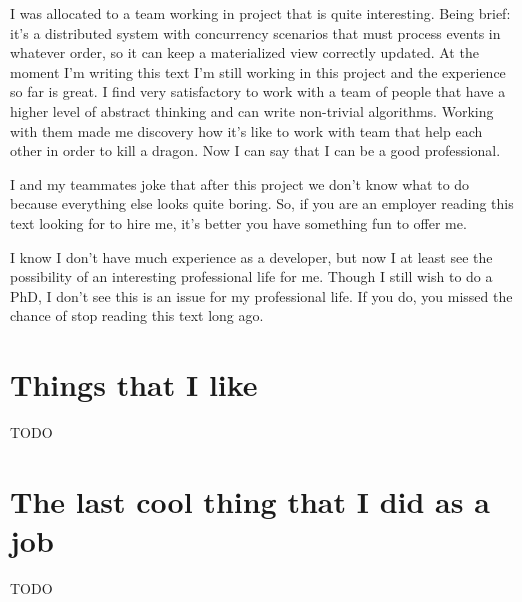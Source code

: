 \documentclass[11pt,a4paper,sans]{moderncv}
\begin{document}
\medskip

I was allocated to a team working in project that is quite interesting.
Being brief: it's a distributed system with concurrency scenarios that must process events in whatever order, so it can keep a materialized view correctly updated.
At the moment I'm writing this text I'm still working in this project and the experience so far is great.
I find very satisfactory to work with a team of people that have a higher level of abstract thinking and can write non-trivial algorithms.
Working with them made me discovery how it's like to work with team that help each other in order to kill a dragon.
Now I can say that I can be a good professional.

\medskip

I and my teammates joke that after this project we don't know what to do because everything else looks quite boring.
So, if you are an employer reading this text looking for to hire me, it's better you have something fun to offer me.

\medskip

I know I don't have much experience as a developer, but now I at least see the possibility of an interesting professional life for me.
Though I still wish to do a PhD, I don't see this is an issue for my professional life.
If you do, you missed the chance of stop reading this text long ago.

\section{Things that I like}
TODO

\section{The last cool thing that I did as a job}
TODO
\end{document}
